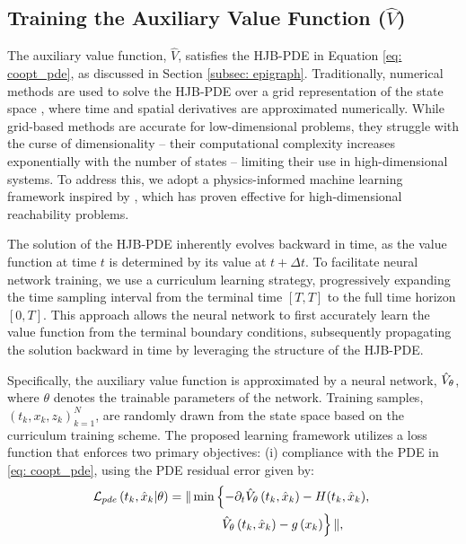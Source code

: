 \subsection{Training the Auxiliary Value Function ($\hat{V}$)}
The auxiliary value function, $\hat{V}$, satisfies the HJB-PDE in Equation \eqref{eq: coopt_pde}, as discussed in Section \ref{subsec: epigraph}.
Traditionally, numerical methods are used to solve the HJB-PDE over a grid representation of the state space \cite{mitchell2004toolbox, pythonhjtoolbox}, where time and spatial derivatives are approximated numerically. While grid-based methods are accurate for low-dimensional problems, they struggle with the curse of dimensionality -- their computational complexity increases exponentially with the number of states -- limiting their use in high-dimensional systems. To address this, we adopt a physics-informed machine learning framework inspired by \cite{9561949, singh2024exactimpositionsafetyboundary}, which has proven effective for high-dimensional reachability problems.

The solution of the HJB-PDE inherently evolves backward in time, as the value function at time $t$ is determined by its value at $t + \Delta t$. To facilitate neural network training, we use a curriculum learning strategy, progressively expanding the time sampling interval from the terminal time $[T, T]$ to the full time horizon $[0, T]$. This approach allows the neural network to first accurately learn the value function from the terminal boundary conditions, subsequently propagating the solution backward in time by leveraging the structure of the HJB-PDE.

Specifically, the auxiliary value function is approximated by a neural network, $\hat{V}_{\theta}$, where $\theta$ denotes the trainable parameters of the network. Training samples, $(t_k, x_k, z_k)_{k=1}^N$, are randomly drawn from the state space based on the curriculum training scheme. The proposed learning framework utilizes a loss function that enforces two primary objectives: (i) compliance with the PDE in \eqref{eq: coopt_pde}, using the PDE residual error given by:
\begin{equation}
\begin{aligned}
\mathcal{L}_{pde}\left(t_k, \hat{x}_k | \theta\right)&=\| \min \left\{-\partial_t \hat{V}_{\theta}\left(t_k, \hat{x}_k\right)- H(t_k,\hat{x}_k),\right. \\
& \qquad \qquad \left.\hat{V}_{\theta}\left(t_k, \hat{x}_k\right) - g\left(x_k\right)\right\} \| ,
\end{aligned}
\end{equation}

